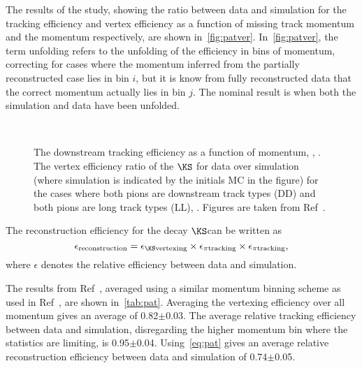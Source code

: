 The results of the study, showing the ratio between data and simulation for the tracking efficiency and vertex efficiency as a function of missing track momentum and the \KS momentum respectively, are shown in~\autoref{fig:patver}. In~\autoref{fig:patver}, the term unfolding refers to the unfolding of the efficiency in bins of momentum, correcting for cases where the momentum inferred from the partially reconstructed case lies in bin $i$, but it is know from fully reconstructed data that the correct momentum actually lies in bin $j$. The nominal result is when both the simulation and data have been unfolded.
\begin{figure}[h]
  \centering
\\
\caption{The downstream tracking efficiency as a function of momentum, \protect{}, \protect{}. The vertex efficiency ratio of the $\KS$ for data over simulation (where simulation is indicated by the initials MC in the figure) for the cases where both pions are downstream track types (\Gls{DD}) and both pions are long track types (\Gls{LL}), \protect{}. Figures are taken from Ref~\cite{DDpat}.}
\label{fig:patver}
\end{figure}
The reconstruction efficiency for the decay $\KS$\to\pip\pim can be written as
\begin{equation}
  \epsilon_{\mathrm{reconstruction}} = \epsilon_{\mathrm{\KS vertexing}}\times\epsilon_{\pi\mathrm{ tracking}}\times\epsilon_{\pi\mathrm{ tracking}},
  \label{eq:pat}
\end{equation}  
where $\epsilon$ denotes the relative efficiency between data and simulation.%

The results from Ref~\cite{DDpat}, averaged using a similar momentum binning scheme as used in Ref~\cite{LHCB-DP-2013-002}, are shown in~\autoref{tab:pat}. Averaging the vertexing efficiency over all \KS momentum gives an average of 0.82$\pm$0.03. The average relative tracking efficiency between data and simulation, disregarding the higher momentum bin where the statistics are limiting, is 0.95$\pm$0.04. Using~\autoref{eq:pat} gives an average relative reconstruction efficiency between data and simulation of 0.74$\pm$0.05. 

